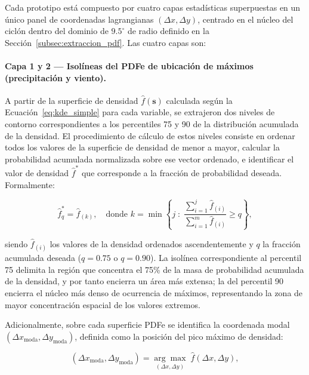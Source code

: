 Cada prototipo está compuesto por cuatro capas estadísticas superpuestas en un único panel de coordenadas lagrangianas $(\Delta x, \Delta y)$, centrado en el núcleo del ciclón dentro del dominio de $9.5^{\circ}$ de radio definido en la Sección~\ref{subsec:extraccion_pdf}.
Las cuatro capas son:

\paragraph{Capa 1 y 2 — Isolíneas del PDFe de ubicación de máximos (precipitación y viento).}

A partir de la superficie de densidad $\hat{f}(\mathbf{s})$ calculada según la Ecuación~\ref{eq:kde_simple} para cada variable, se extrajeron dos niveles de contorno correspondientes a los percentiles 75 y 90 de la distribución acumulada de la densidad. 
El procedimiento de cálculo de estos niveles consiste en ordenar todos los valores de la superficie de densidad de menor a mayor, calcular la probabilidad acumulada normalizada sobre ese vector ordenado, e identificar el valor de densidad $\hat{f}^*$ que corresponde a la fracción de probabilidad deseada. Formalmente:

\begin{equation}
    \hat{f}^*_q = \hat{f}_{(k)}, \quad \text{donde } k = \min\left\{j \; : \; 
    \frac{\sum_{i=1}^{j}\hat{f}_{(i)}}{\sum_{i=1}^{m}\hat{f}_{(i)}} \geq q \right\},
\label{eq:nivel_contorno_kde}
\end{equation}

siendo $\hat{f}_{(i)}$ los valores de la densidad ordenados ascendentemente y $q$ la fracción acumulada deseada ($q = 0.75$ o $q = 0.90$). 
La isolínea correspondiente al percentil 75 delimita la región que concentra el 75\% de la masa de probabilidad acumulada de la densidad, y por tanto encierra un área más extensa; la del percentil 90 
encierra el núcleo más denso de ocurrencia de máximos, representando la zona de mayor concentración espacial de los valores extremos. 

Adicionalmente, sobre cada superficie PDFe se identifica la coordenada modal $(\Delta x_{\text{moda}}, \Delta y_{\text{moda}})$, definida como la posición del pico máximo de densidad:

\begin{equation}
    (\Delta x_{\text{moda}}, \Delta y_{\text{moda}}) = 
    \underset{(\Delta x, \Delta y)}{\arg\max} \; \hat{f}(\Delta x, \Delta y),
\label{eq:moda_kde}
\end{equation}

